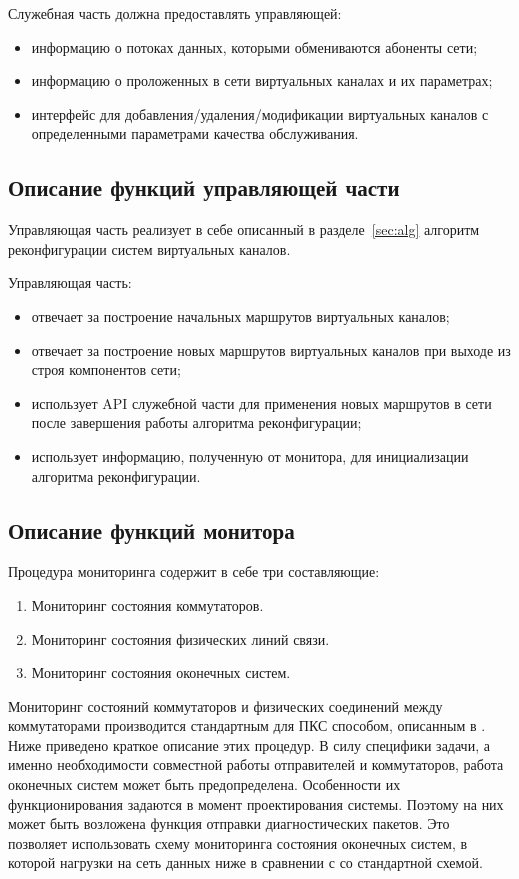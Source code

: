 \documentclass[12pt, a4paper]{article}
\begin{document}
Служебная часть должна предоставлять управляющей:
\begin{itemize}
	\item информацию о потоках данных, которыми обмениваются абоненты сети;
	\item информацию о проложенных в сети виртуальных каналах и их параметрах;
	\item интерфейс для добавления/удаления/модификации виртуальных каналов с определенными параметрами качества обслуживания.
\end{itemize}

\subsection{Описание функций управляющей части}
Управляющая часть реализует в себе описанный в разделе~\ref{sec:alg} алгоритм реконфигурации систем виртуальных каналов.

Управляющая часть:
\begin{itemize}
	\item отвечает за построение начальных маршрутов виртуальных каналов;
	\item отвечает за построение новых маршрутов виртуальных каналов при выходе из строя компонентов сети;
	\item использует API служебной части для применения новых маршрутов в сети после завершения работы алгоритма реконфигурации;
	\item использует информацию, полученную от монитора, для инициализации алгоритма реконфигурации.
\end{itemize}

\subsection{Описание функций монитора}

Процедура мониторинга содержит в себе три составляющие:
\begin{enumerate}
	\item Мониторинг состояния коммутаторов.
	\item Мониторинг состояния физических линий связи.
	\item Мониторинг состояния оконечных систем.
\end{enumerate}

Мониторинг состояний коммутаторов и физических соединений между коммутаторами производится стандартным для ПКС способом, описанным в \cite{monitor1, monitor2}. Ниже приведено краткое описание этих процедур. В силу специфики задачи, а именно необходимости совместной работы отправителей и коммутаторов, работа оконечных систем может быть предопределена. Особенности их функционирования задаются в момент проектирования системы. Поэтому на них может быть возложена функция отправки диагностических пакетов. Это позволяет использовать схему мониторинга состояния оконечных систем, в которой нагрузки на сеть данных ниже в сравнении с со стандартной схемой.
\end{document}
